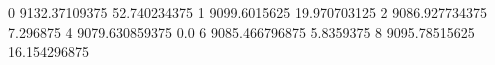 0 9132.37109375 52.740234375
1 9099.6015625 19.970703125
2 9086.927734375 7.296875
4 9079.630859375 0.0
6 9085.466796875 5.8359375
8 9095.78515625 16.154296875
